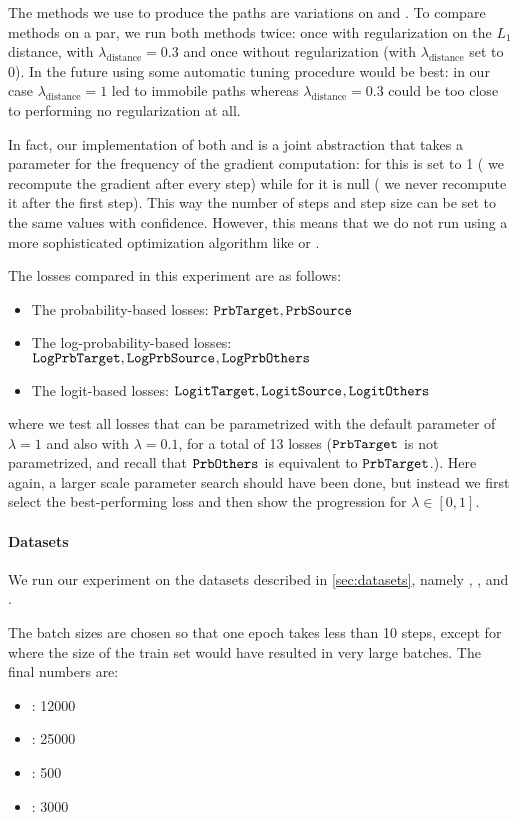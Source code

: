 \documentclass[../main.tex]{subfiles}
\begin{document}
The methods we use to produce the paths are variations on \ls{} and \revise{}.
To compare methods on a par, we run both methods twice: once with regularization on the $L_1$ distance, with $\lambda_\text{distance} = 0.3$ and once without regularization (with $\lambda_\text{distance}$ set to 0).
In the future using some automatic tuning procedure would be best: in our case $\lambda_\text{distance} = 1$ led to immobile paths whereas $\lambda_\text{distance} = 0.3$ could be too close to performing no regularization at all.

In fact, our implementation of both \ls{} and \revise{} is a joint abstraction that takes a parameter for the frequency of the gradient computation: for \revise{} this is set to 1 (\ie{} we recompute the gradient after every step) while for \ls{} it is null (\ie{} we never recompute it after the first step).
This way the number of steps and step size can be set to the same values with confidence.
However, this means that we do not run \revise{} using a more sophisticated optimization algorithm like  or .

The losses compared in this experiment are as follows:
\begin{itemize}
    \item The probability-based losses: $\mathtt{PrbTarget}, \mathtt{PrbSource}_{}$
    \item The log-probability-based losses: $\mathtt{LogPrbTarget}, \mathtt{LogPrbSource}_{}, \mathtt{LogPrbOthers}_{}$
    \item The logit-based losses: $\mathtt{LogitTarget}, \mathtt{LogitSource}_{}, \mathtt{LogitOthers}_{}$
\end{itemize}
where we test all losses that can be parametrized with the default parameter of $\lambda = 1$ and also with $\lambda = 0.1$, for a total of 13 losses ($\mathtt{PrbTarget}$ is not parametrized, and recall that $\mathtt{PrbOthers}_{}$ is equivalent to $\mathtt{PrbTarget}$.).
Here again, a larger scale parameter search should have been done, but instead we first select the best-performing loss and then show the progression for $\lambda \in [0, 1]$.

\paragraph{Datasets}

We run our experiment on the datasets described in \autoref{sec:datasets}, namely \CakeOnSea, \ForestCover, \WineQuality{} and \OnlineNewsPopularity.

The batch sizes are chosen so that one epoch takes less than 10 steps, except for \ForestCover{} where the size of the train set would have resulted in very large batches.
The final numbers are:
\begin{itemize}
    \item \CakeOnSea: 12000
    \item \ForestCover: 25000
    \item \WineQuality: 500
    \item \OnlineNewsPopularity: 3000
\end{itemize}
\end{document}

